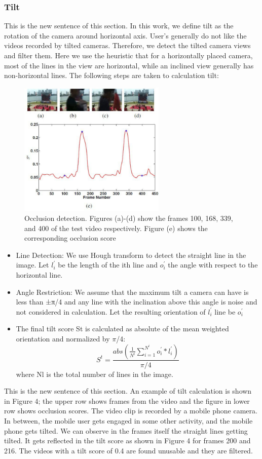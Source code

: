 \documentclass{sig-alternate}
\begin{document}
{{{\subsubsection{Tilt}
This is the new sentence of this section.
In this work, we define tilt as the rotation of the camera around
horizontal axis. User’s generally do not like the videos recorded
by tilted cameras. Therefore, we detect the tilted camera views
and filter them. Here we use the heuristic that for a horizontally
placed camera, most of the lines in the view are horizontal, while
an inclined view generally has non-horizontal lines. The following
steps are taken to calculation tilt:

\begin{figure}
    \centering
    \includegraphics[width=70mm]{video.pdf}
    \caption{Occlusion detection. Figures (a)-(d) show the frames
100, 168, 339, and 400 of the test video respectively. Figure (e)
shows the corresponding occlusion score}
    \label{fig:my_label}
\end{figure}


\begin{itemize}
    \item Line Detection: We use Hough transform to detect the straight
line in the image. Let $l^'_i$ be the length of the ith line and $o^'_i$
the angle with respect to the horizontal line.
  \item Angle Restriction: We assume that the maximum tilt a camera
can have is less than ±π/4 and any line with the inclination
above this angle is noise and not considered in calculation.
Let the resulting orientation of $l^'_i$ line be $o^'_i$
  \item The final tilt score St is calculated as absolute of the mean
weighted orientation and normalized by $\pi$/4:
$$
  S^t=\frac{abs(\frac{1}{N^i}\sum^{N^i}_{i=1}{o^'_i}*{l^'_i})}{{\pi}/4}
$$
where Nl is the total number of lines in the image.
\end{itemize}
This is the new sentence of this section.
An example of tilt calculation is shown in Figure 4; the upper
row shows frames from the video and the figure in lower row shows
occlusion scores. The video clip is recorded by a mobile phone
camera. In between, the mobile user gets engaged in some other
activity, and the mobile phone gets tilted. We can observe in the
frames itself the straight lines getting tilted. It gets reflected in the
tilt score as shown in Figure 4 for frames 200 and 216. The videos
with a tilt score of 0.4 are found unusable and they are filtered.



}}}
\end{document}
